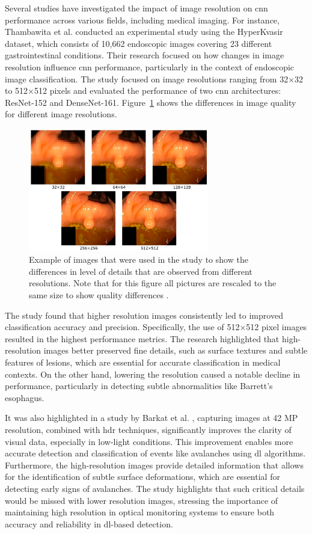 Several studies have investigated the impact of image resolution on \gls{cnn} performance across various fields, including medical imaging. For instance, Thambawita et al. \cite{RES_IMP} conducted an experimental study using the HyperKvasir dataset, which consists of 10,662 endoscopic images covering 23 different gastrointestinal conditions. Their research focused on how changes in image resolution influence \gls{cnn} performance,  particularly in the context of endoscopic image classification. The study focused on image resolutions ranging from 32×32 to 512×512 pixels and evaluated the performance of two \gls{cnn} architectures: ResNet-152 and DenseNet-161. Figure~\ref{RES_COMP} shows the differences in image quality for different image resolutions. 
\begin{figure}[!ht]
    \centering
    \includegraphics[width=0.7\textwidth]{Figures/RES_COMP.png}  
    \caption{Example of images that were used in the study to show the differences in level of details that are observed from different resolutions. Note that for this figure all pictures are rescaled to the same size to show quality differences \cite{RES_IMP}.}
    \label{RES_COMP}
\end{figure}

The study \cite{RES_IMP} found that higher resolution images consistently led to improved classification accuracy and precision. Specifically, the use of 512×512 pixel images resulted in the highest performance metrics. The research highlighted that high-resolution images better preserved fine details, such as surface textures and subtle features of lesions, which are essential for accurate classification in medical contexts. On the other hand, lowering the resolution caused a notable decline in performance, particularly in detecting subtle abnormalities like Barrett’s esophagus.

It was also highlighted in a study by Barkat et al. \cite{RES_HDR_IMP}, capturing images at 42 MP resolution, combined with \gls{hdr} techniques, significantly improves the clarity of visual data, especially in low-light conditions. This improvement enables more accurate detection and classification of events like avalanches using \gls{dl} algorithms. Furthermore, the high-resolution images provide detailed information that allows for the identification of subtle surface deformations, which are essential for detecting early signs of avalanches. The study highlights that such critical details would be missed with lower resolution images, stressing the importance of maintaining high resolution in optical monitoring systems to ensure both accuracy and reliability in \gls{dl}-based detection.

